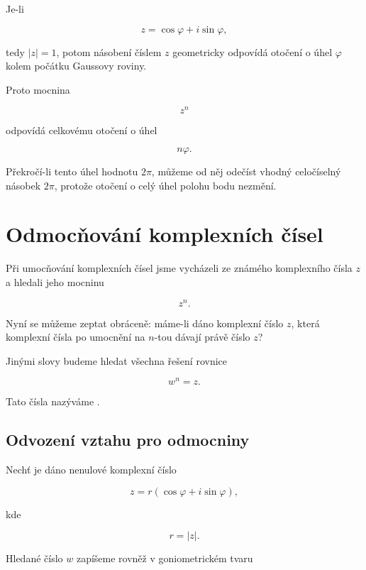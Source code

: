 \documentclass[12pt,a4paper]{article}
\begin{document}
\begin{notebox}

Je-li

\[
    z=\cos\varphi+i\sin\varphi,
\]

tedy $|z|=1$, potom násobení číslem $z$ geometricky odpovídá otočení o úhel
$\varphi$ kolem počátku Gaussovy roviny.

Proto mocnina

\[
    z^n
\]

odpovídá celkovému otočení o úhel

\[
    n\varphi.
\]

Překročí-li tento úhel hodnotu $2\pi$, můžeme od něj odečíst vhodný celočíselný
násobek $2\pi$, protože otočení o celý úhel polohu bodu nezmění.

\end{notebox}



\section{Odmocňování komplexních čísel}

Při umocňování komplexních čísel jsme vycházeli ze známého komplexního čísla $z$
a hledali jeho mocninu

\[
    z^n.
\]

Nyní se můžeme zeptat obráceně: máme-li dáno komplexní číslo $z$, která komplexní
čísla po umocnění na $n$-tou dávají právě číslo $z$?

Jinými slovy budeme hledat všechna řešení rovnice

\[
    w^n=z.
\]

Tato čísla nazýváme .


\subsection{Odvození vztahu pro odmocniny}

Nechť je dáno nenulové komplexní číslo

\[
    z
    =
    r
    \left(
        \cos\varphi
        +
        i\sin\varphi
    \right),
\]

kde

\[
    r=|z|.
\]

Hledané číslo $w$ zapíšeme rovněž v goniometrickém tvaru
\end{document}

